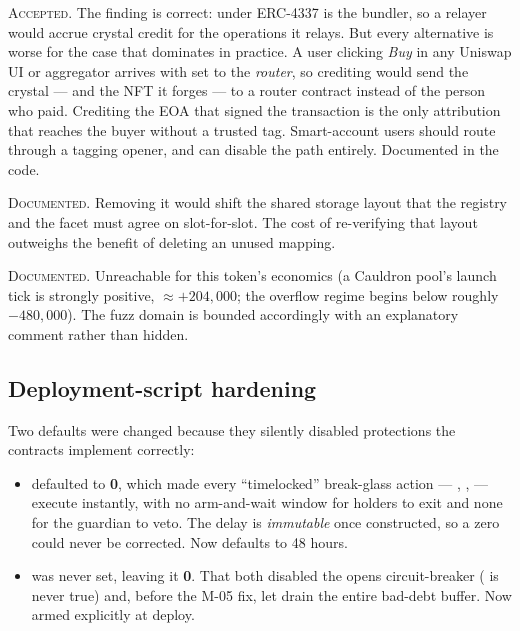 \begin{description}[leftmargin=1.4em,style=nextline]

\item[L-03 --- \texttt{tx.origin} credit attribution.] \textsc{Accepted.} The
finding is correct: under ERC-4337  is the bundler, so a relayer
would accrue crystal credit for the operations it relays. But every alternative
is worse for the case that dominates in practice. A user clicking \emph{Buy} in
any Uniswap UI or aggregator arrives with  set to the \emph{router},
so crediting  would send the crystal --- and the NFT it forges --- to
a router contract instead of the person who paid. Crediting the EOA that signed
the transaction is the only attribution that reaches the buyer without a trusted
tag. Smart-account users should route through a tagging opener, and
 can disable the path entirely. Documented in the code.

\item[I-04 --- the vestigial \texttt{claimed} mapping.] \textsc{Documented.}
Removing it would shift the shared storage layout that the registry and the
 facet must agree on slot-for-slot. The cost of re-verifying
that layout outweighs the benefit of deleting an unused mapping.

\item[I-05 --- \texttt{liquidityForTokenOut} at extreme ticks.]
\textsc{Documented.} Unreachable for this token's economics (a Cauldron pool's
launch tick is strongly positive, $\approx +204{,}000$; the overflow regime
begins below roughly $-480{,}000$). The fuzz domain is bounded accordingly with
an explanatory comment rather than hidden.

\end{description}

\subsection{Deployment-script hardening}

Two defaults were changed because they silently disabled protections the
contracts implement correctly:

\begin{itemize}
\item {} defaulted to \textbf{0}, which made every
``timelocked'' break-glass action --- ,
,  --- execute instantly, with no
arm-and-wait window for holders to exit and none for the guardian to veto. The
delay is \emph{immutable} once constructed, so a zero could never be corrected.
Now defaults to 48 hours.
\item {} was never set, leaving it \textbf{0}. That both
disabled the opens circuit-breaker ( is never
true) and, before the M-05 fix, let  drain the entire
bad-debt buffer. Now armed explicitly at deploy.
\end{itemize}

